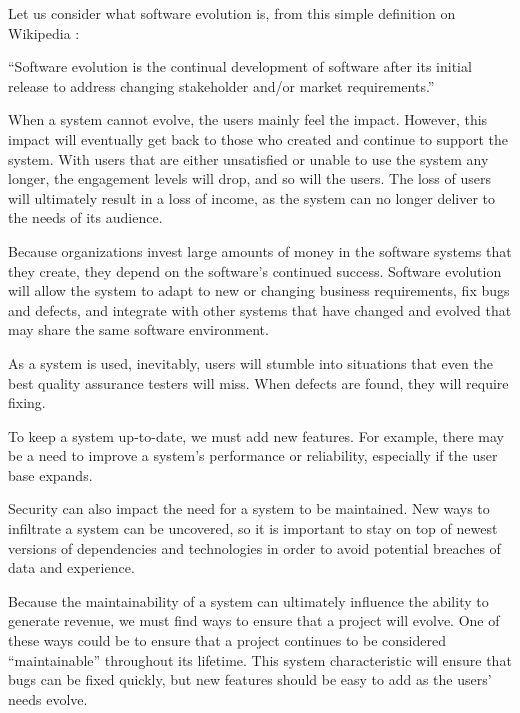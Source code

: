 \documentclass[12pt,conference]{IEEEtran}
\begin{document}
Let us consider what software evolution is, from this simple definition on Wikipedia \cite{wiki:software-evolution}:

\vspace{0.25cm}

\begin{displayquote}
``Software evolution is the continual development of software after its initial release to address changing stakeholder and/or market requirements.''
\end{displayquote}

\vspace{0.25cm}


When a system cannot evolve, the users mainly feel the impact. However, this impact will eventually get back to those who created and continue to support the system. With users that are either unsatisfied or unable to use the system any longer, the engagement levels will drop, and so will the users. The loss of users will ultimately result in a loss of income, as the system can no longer deliver to the needs of its audience.

Because organizations invest large amounts of money in the software systems that they create, they depend on the software's continued success. Software evolution will allow the system to adapt to new or changing business requirements, fix bugs and defects, and integrate with other systems that have changed and evolved that may share the same software environment.

As a system is used, inevitably, users will stumble into situations that even the best quality assurance testers will miss. When defects are found, they will require fixing. 

To keep a system up-to-date, we must add new features. For example, there may be a need to improve a system's performance or reliability, especially if the user base expands.

Security can also impact the need for a system to be maintained. New ways to infiltrate a system can be uncovered, so it is important to stay on top of newest versions of dependencies and technologies in order to avoid potential breaches of data and experience.


Because the maintainability of a system can ultimately influence the ability to generate revenue, we must find ways to ensure that a project will evolve. One of these ways could be to ensure that a project continues to be considered ``maintainable'' throughout its lifetime. This system characteristic will ensure that bugs can be fixed quickly, but new features should be easy to add as the users' needs evolve.
\end{document}
